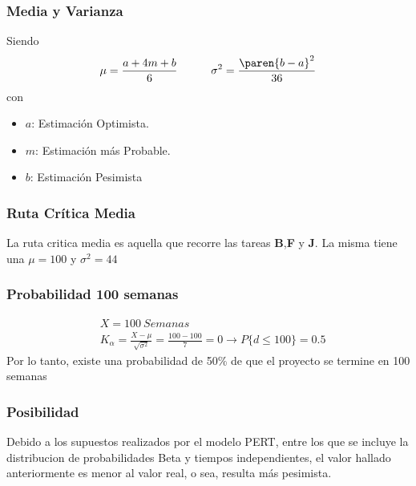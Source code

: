 \begin{homeworkProblem}
\subsubsection{Media y Varianza}
Siendo
\begin{align*}
    \mu=\frac{a+4m+b}{6} \quad\quad\quad \sigma^2=\frac{\paren{b-a}^2}{36}  
\end{align*}
con 
\begin{itemize}
    \item $a$: Estimación Optimista.
    \item $m$: Estimación más Probable. 
    \item $b$: Estimación Pesimista
\end{itemize}
\subsubsection{Ruta Crítica Media}
La ruta critica media es aquella que recorre las tareas \textbf{B},\textbf{F} y \textbf{J}. La misma tiene una $\mu=100$ y $\sigma^2=44$
\subsubsection{Probabilidad 100 semanas}
\begin{align*}
    &X = 100\ Semanas  \\
   &K_{\alpha} = \frac{X-\mu}{\sqrt{\sigma^2}}=\frac{100-100}{7}=0\rightarrow P\{d\leq100\}=0.5 
\end{align*}
Por lo tanto, existe una probabilidad de 50\% de que el proyecto se termine en 100 semanas
\subsubsection{Posibilidad}
Debido a los supuestos realizados por el modelo PERT, entre los que se incluye la distribucion de probabilidades Beta y tiempos independientes, el valor hallado anteriormente es menor al valor real, o sea, resulta más pesimista.
\end{homeworkProblem}